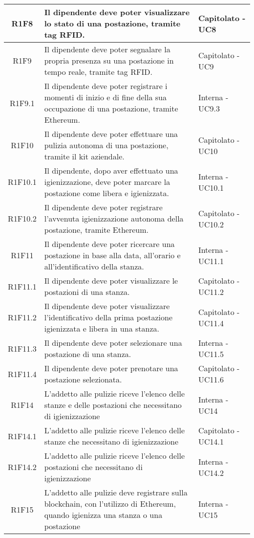 \begin{center}
\begin{longtable}{|c|p{10cm}|p{4cm}|}
\hline
					R1F8&Il dipendente deve poter visualizzare lo stato di una postazione, tramite tag RFID.	&Capitolato - UC8 	\\
					\hline
			R1F9&Il dipendente deve poter segnalare la propria presenza su una postazione in tempo reale, tramite tag RFID.	&Capitolato - UC9 	\\
		\hline
		R1F9.1&Il dipendente deve poter registrare i momenti di inizio e di fine della sua occupazione di una postazione, tramite Ethereum.	&Interna - UC9.3 	\\
		\hline	
		R1F10&Il dipendente deve poter effettuare una pulizia autonoma di una postazione, tramite il kit aziendale.	&Capitolato - UC10	\\
		\hline		
		R1F10.1&Il dipendente, dopo aver effettuato una igienizzazione, deve poter marcare la postazione come libera e igienizzata.	&Interna - UC10.1	\\
		\hline	
		R1F10.2&Il dipendente deve poter registrare l'avvenuta igienizzazione autonoma della postazione, tramite Ethereum.	&Capitolato - UC10.2	\\
		\hline	
		R1F11&Il dipendente deve poter ricercare una postazione in base alla data, all'orario e all'identificativo della stanza.	&Interna - UC11.1	\\
		\hline
		R1F11.1&Il dipendente deve poter visualizzare le postazioni di una stanza.	&Capitolato - UC11.2	\\
		\hline
		R1F11.2&Il dipendente deve poter visualizzare l'identificativo della prima postazione igienizzata e libera in una stanza.	&Capitolato - UC11.4	\\
		\hline
		R1F11.3&Il dipendente deve poter selezionare una postazione di una stanza.	&Interna - UC11.5	\\
		\hline
		R1F11.4&Il dipendente deve poter prenotare una postazione selezionata.	&Capitolato - UC11.6	\\
		\hline
R1F14&L'addetto alle pulizie riceve l'elenco delle stanze e delle postazioni che necessitano di igienizzazione	& Interna - UC14	\\
						\hline
			R1F14.1&	L'addetto alle pulizie riceve l'elenco delle stanze che necessitano di igienizzazione& 	Capitolato - UC14.1\\
					\hline
			R1F14.2&L'addetto alle pulizie riceve l'elenco delle postazioni che necessitano di igienizzazione	& Interna - UC14.2	\\
					\hline
R1F15&L'addetto alle pulizie deve registrare sulla blockchain, con l'utilizzo di Ethereum, quando igienizza una stanza o una postazione	& Interna - UC15	\\

\end{longtable}
\end{center}
